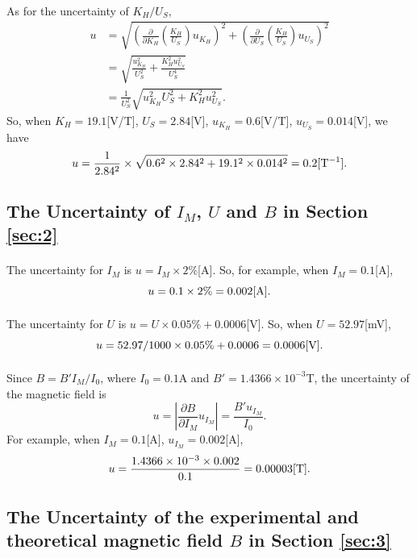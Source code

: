 \documentclass[a4paper]{article}
\begin{document}
    \paragraph{} As for the uncertainty of $K_H/U_S$, \begin{equation*}
        \begin{split}
            u&=\sqrt{\left(\frac{\partial}{\partial K_H}\left(\frac{K_H}{U_S}\right)u_{K_H}\right)^2+\left(\frac{\partial}{\partial U_S}\left(\frac{K_H}{U_S}\right)u_{U_S}\right)^2}\\
            &=\sqrt{\frac{u_{K_H}^2}{U_S^2}+\frac{K_H^2u_{U_S}^2}{U_S^4}}\\
            &=\frac{1}{U_S^2}\sqrt{u_{K_H}^2U_S^2+K_H^2u_{U_S}^2}.
        \end{split}
    \end{equation*} 
    So, when $K_H=19.1$[V/T], $U_S=2.84$[V], $u_{K_H}=0.6$[V/T], $u_{U_S}=0.014$[V], we have $$u=\frac{1}{2.84^2}\times\sqrt{0.6^2\times 2.84^2+19.1^2\times 0.014^2}=0.2[{\rm T}^{-1}].$$
    \subsection{The Uncertainty of $I_M$, $U$ and $B$ in Section \ref{sec:2}}
    \paragraph{} The uncertainty for $I_M$ is $u=I_M\times 2\%$[A]. So, for example, when $I_M=0.1$[A], $$u=0.1\times 2\%=0.002[\rm A].$$ 
    \paragraph{} The uncertainty for $U$ is $u=U\times 0.05\%+0.0006$[V]. So, when $U=52.97$[mV], $$u=52.97/1000\times 0.05\%+0.0006=0.0006[\rm V].$$
    \paragraph{} Since $B=B'I_M/I_0$, where $I_0=0.1$A and $B'=1.4366\times 10^{-3}$T, the uncertainty of the magnetic field is $$u=\left|\frac{\partial B}{\partial I_M}u_{I_M}\right|=\frac{B'u_{I_M}}{I_0}.$$ For example, when $I_M=0.1$[A], $u_{I_M}=0.002$[A], $$u=\frac{1.4366\times 10^{-3}\times 0.002}{0.1}=0.00003[\rm T].$$
    \subsection{The Uncertainty of the experimental and theoretical magnetic field $B$ in Section \ref{sec:3}}
\end{document}
